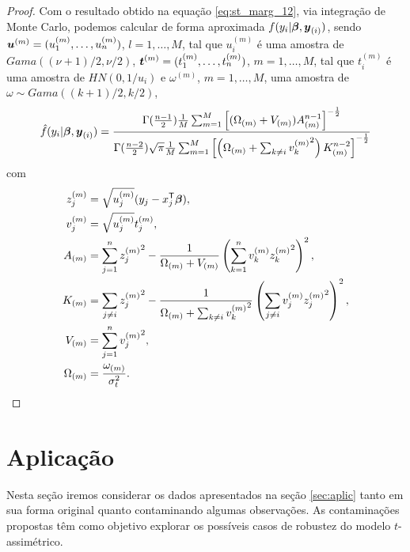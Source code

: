 \begin{proof}
Com o resultado obtido na equação \eqref{eq:st_marg_12}, via integração de Monte Carlo, podemos calcular de forma aproximada $f(y_i|{\boldsymbol{\beta}},{\boldsymbol{y}_{(i)}})$, sendo ${\boldsymbol{u}}^{(m)} = (u_1^{(m)},\ldots,u_n^{(m)})$, $l=1,\ldots,M$, tal que $u_i^{(m)}$ é uma amostra de $Gama((\nu+1)/2,\nu/2)$, ${\boldsymbol{t}}^{(m)} = (t_1^{(m)},\ldots,t_n^{(m)})$, $m=1,\ldots,M$, tal que $t_i^{(m)}$ é uma amostra de $HN(0,1/u_i)$ e $\omega^{(m)}$, $m=1,\ldots,M$, uma amostra de $\omega \sim Gama((k+1)/2,k/2)$,
\begin{equation}
\begin{split}
\hat{f}(y_i|{\boldsymbol{\beta}},{\boldsymbol{y}_{(i)}}) =
\frac{\Gamma(\frac{n-1}{2})\frac{1}{M}\sum_{m=1}^M\left[(\Omega_{(m)}+V_{(m)}) A_{(m)}^{n-1}\right]^{-\frac{1}{2}}}
{\Gamma(\frac{n-2}{2})\sqrt{\pi}\frac{1}{M}\sum_{m=1}^M \left[ \left(\Omega_{(m)} + \sum_{k \neq i}{v_k^{(m)}}^2\right) K_{(m)}^{n-2}\right]^{-\frac{1}{2}}}
\end{split}
\end{equation}
com
\begin{equation}
\begin{split}
z_j^{(m)} & = \sqrt{u^{(m)}_j}(y_j-x_j^{\mathsf{T}}{\boldsymbol{\beta}}) ,\\
v_j^{(m)} & = \sqrt{u^{(m)}_j}t_j^{(m)} ,\\
A_{(m)} & = \sum_{j=1}^n{z_j^{(m)}}^2 - \frac{1}{\Omega_{(m)} + V_{(m)}}\left(\sum_{k=1}^nv_k^{(m)}{z_k^{(m)}}^2\right)^2 ,\\
K_{(m)} & = \sum_{j\neq i}{z_j^{(m)}}^2-\frac{1}{\Omega_{(m)}+\sum_{k \neq i}{v_k^{(m)}}^2}\left(\sum_{j\neq i}v_j^{(m)}{z_j^{(m)}}^2\right)^2 ,\\
V_{(m)} & = \sum_{j=1}^n {v_j^{(m)}}^2 ,\\
\Omega_{(m)} & = \frac{\omega_{(m)}}{\sigma^2_t}.
\end{split}
\end{equation}

\end{proof}

\newpage
\section{Aplicação}
\label{sec:aplic_asim}

Nesta seção iremos considerar os dados apresentados na seção \ref{sec:aplic} tanto em sua forma original quanto contaminando algumas observações. As contaminações propostas têm como objetivo explorar os possíveis casos de robustez do modelo $t$-assimétrico.
